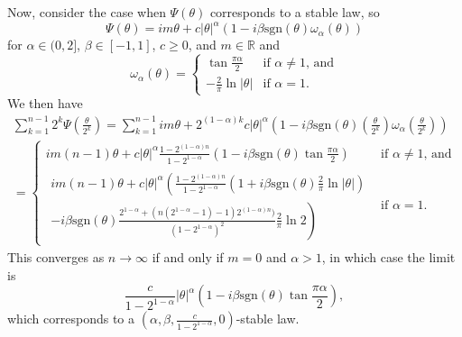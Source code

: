 \documentclass[11pt]{amsart}
\theoremstyle{remark}
\theoremstyle{definition}
\begin{document}
Now, consider the case when $\Psi(\theta)$ corresponds to a stable law, so
\[
	\Psi(\theta) = im\theta + c|\theta|^{\alpha} (1-i\beta \text{sgn}(\theta)\omega_{\alpha}(\theta))
\]
for $\alpha \in (0,2]$, $\beta \in [-1,1]$, $c \geq 0$, and $m \in \mathbb{R}$ and
\[
	\omega_{\alpha}(\theta) = \begin{cases}
		\tan{\frac{\pi\alpha}{2}} & \text{if $\alpha \neq 1$, and}\\
		-\frac{2}{\pi}\ln{|\theta|} & \text{if $\alpha = 1$.}
	\end{cases}
\]
We then have
\begin{multline*}
	 \sum_{k=1}^{n-1}  {\textstyle 2^{k} \Psi\left(\frac{\theta}{2^{k}}\right)}
	 =  \sum_{k=1}^{n-1} im\theta + 2^{(1-\alpha)k} c|\theta|^{\alpha} {\textstyle\left(1-i \beta\text{sgn}(\theta)\left(\frac{\theta}{2^{k}}\right)
	 	 \omega_{\alpha}\left(\frac{\theta}{2^{k}}\right)\right)}\\
	= 
	\begin{cases}
		 im(n-1)\theta + c|\theta|^{\alpha}\frac{1-2^{(1-\alpha)n}}{1-2^{1-\alpha}}\left(1-i\beta \text{sgn}(\theta) \tan{\frac{\pi\alpha}{2}}\right) & \text{if $\alpha \neq 1$, and}\\	
		 \begin{multlined}
		 im(n-1)\theta + c|\theta|^{\alpha}  \left(\frac{1-2^{(1-\alpha)n}}{1-2^{1-\alpha}}
		 \left(1+i \beta \text{sgn}(\theta)\frac{2}{\pi}\ln{|\theta|} \right)\right.\\
		\left. -i\beta \text{sgn}(\theta) \frac{2^{1-\alpha} + (n(2^{1-\alpha}-1)-1)2^{(1-\alpha)n})}{(1-2^{1-\alpha})^{2}}\frac{2}{\pi}\ln{2}
		\right)    
		\end{multlined}
		& \text{if $\alpha = 1$.}
	\end{cases}
\end{multline*}
This converges as $n \to \infty$ if and only if $m = 0$ and $\alpha > 1$, in which case the limit is 
\[
	 \frac{c}{1-2^{1-\alpha}}|\theta|^{\alpha}\left(1-i\beta \text{sgn}(\theta) \tan{\frac{\pi\alpha}{2}}\right), 
\]
which corresponds to a $\left(\alpha,\beta, \frac{c}{1-2^{1-\alpha}},0\right)$-stable law.

\end{document}
